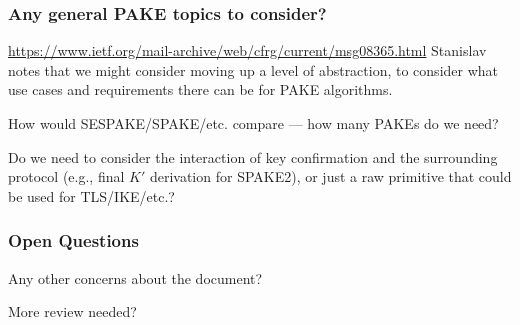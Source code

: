 \documentclass{beamer}
\begin{document}
\begin{frame}[fragile]
\frametitle{Any general PAKE topics to consider?}
\url{https://www.ietf.org/mail-archive/web/cfrg/current/msg08365.html}
Stanislav notes that we might consider moving up a level of abstraction,
to consider what use cases and requirements there can be for PAKE algorithms.

How would SESPAKE/SPAKE/etc. compare --- how many PAKEs do we need?

Do we need to consider the interaction of key confirmation and the
surrounding protocol (e.g., final $K'$ derivation for SPAKE2), or just
a raw primitive that could be used for TLS/IKE/etc.?
\end{frame}

\begin{frame}
\frametitle{Open Questions}

Any other concerns about the document?

More review needed?
\end{frame}
\end{document}
